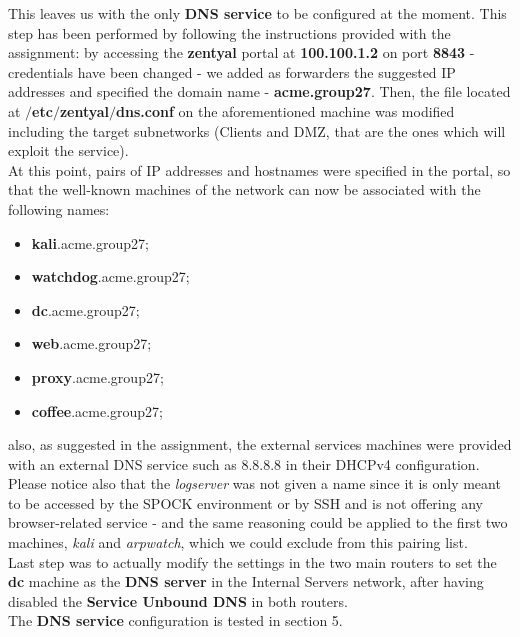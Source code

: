 This leaves us with the only \textbf{DNS service} to be configured at the moment. This step has been performed by following the instructions provided with the assignment: by accessing the \textbf{zentyal} portal at \textbf{100.100.1.2} on port \textbf{8843} - credentials have been changed - we added as forwarders the suggested IP addresses and specified the domain name - \textbf{acme.group27}. Then, the file located at \textbf{$/$etc$/$zentyal$/$dns.conf} on the aforementioned machine was modified including the target subnetworks (Clients and DMZ, that are the ones which will exploit the service).\\
At this point, pairs of IP addresses and hostnames were specified in the portal, so that the well-known machines of the network can now be associated with the following names:\\
\begin{itemize}
\item \textbf{kali}.acme.group27;
\item \textbf{watchdog}.acme.group27;
\item \textbf{dc}.acme.group27;
\item \textbf{web}.acme.group27;
\item \textbf{proxy}.acme.group27;
\item \textbf{coffee}.acme.group27;
\end{itemize}

also, as suggested in the assignment, the external services machines were provided with an external DNS service such as 8.8.8.8 in their DHCPv4 configuration. Please notice also that the \textit{logserver} was not given a name since it is only meant to be accessed by the SPOCK environment or by SSH and is not offering any browser-related service - and the same reasoning could be applied to the first two machines, \textit{kali} and \textit{arpwatch}, which we could exclude from this pairing list.\\
Last step was to actually modify the  settings in the two main routers to set the \textbf{dc} machine as the \textbf{DNS server} in the Internal Servers network, after having disabled the \textbf{Service Unbound DNS} in both routers.\\
The \textbf{DNS service} configuration is tested in section 5.
